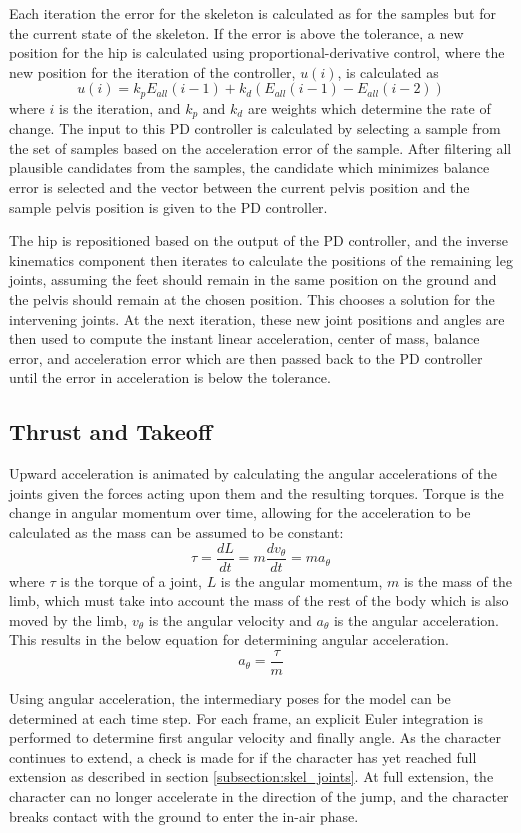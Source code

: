Each iteration the error for the skeleton is calculated as for the samples but for the current state of the skeleton.  If the error is above the tolerance, a new position for the hip is calculated using proportional-derivative control, where the new position for the iteration of the controller, $u(i)$, is calculated as \[u(i) = k_p E_{all}(i - 1) + k_d(E_{all}(i-1) - E_{all}(i-2))\] where $i$ is the iteration, and $k_p$ and $k_d$ are weights which determine the rate of change.  The input to this PD controller is calculated by selecting a sample from the set of samples based on the acceleration error of the sample.  After filtering all plausible candidates from the samples, the candidate which minimizes balance error is selected and the vector between the current pelvis position and the sample pelvis position is given to the PD controller.  

The hip is repositioned based on the output of the PD controller, and the inverse kinematics component then iterates to calculate the positions of the remaining leg joints, assuming the feet should remain in the same position on the ground and the pelvis should remain at the chosen position.  This chooses a solution for the intervening joints.  At the next iteration, these new joint positions and angles are then used to compute the instant linear acceleration, center of mass, balance error, and acceleration error which are then passed back to the PD controller until the error in acceleration is below the tolerance.


\subsection{Thrust and Takeoff}
\label{subsection:thrust}
Upward acceleration is animated by calculating the angular accelerations of the joints given the forces acting upon them and the resulting torques.  Torque is the change in angular momentum over time, allowing for the acceleration to be calculated as the mass can be assumed to be constant: \[\tau = \dfrac{dL}{dt} = m \dfrac{dv_{\theta}}{dt} = m a_{\theta}\] where $\tau$ is the torque of a joint, $L$ is the angular momentum, $m$ is the mass of the limb, which must take into account the mass of the rest of the body which is also moved by the limb, $v_{\theta}$ is the angular velocity and $a_{\theta}$ is the angular acceleration. This results in the below equation for determining angular acceleration. \[a_{\theta} = \dfrac{\tau}{m}\]

Using angular acceleration, the intermediary poses for the model can be determined at each time step.   For each frame, an explicit Euler integration is performed to determine first angular velocity and finally angle.  As the character continues to extend, a check is made for if the character has yet reached full extension as described in section \ref{subsection:skel_joints}.  At full extension, the character can no longer accelerate in the direction of the jump, and the character breaks contact with the ground to enter the in-air phase.

